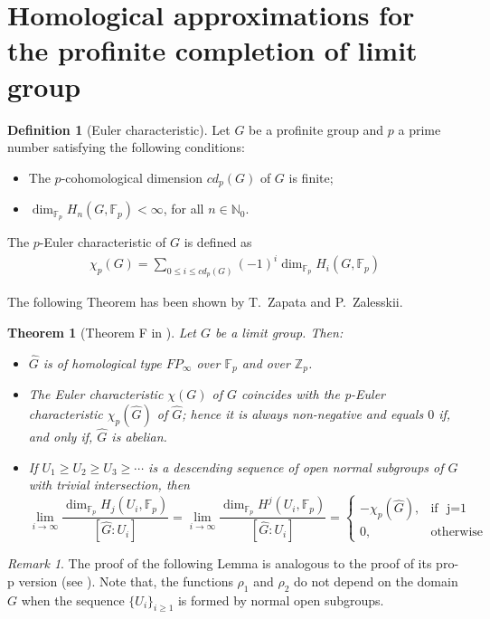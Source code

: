 \documentclass[10pt]{amsart}
\theoremstyle{plain}
\newtheorem{thm}[prop]{Theorem}
\theoremstyle{definition}
\newtheorem*{defi}{Definition}
\theoremstyle{remark}
\newtheorem{rem}[prop]{Remark}
\numberwithin{prop}{section}
\numberwithin{example}{section}
\numberwithin{equation}{section}
\newcommand{\Z}{\mathbb{Z}}
\newcommand{\N}{\mathbb{N}}
\newcommand{\F}{\mathbb{F}}
\begin{document}
	\section{Homological approximations for the   profinite completion  of  limit group}
	\label{nsb}
\begin{defi}[Euler characteristic]
		Let   $G$ be a profinite group  and $p$ a prime number   satisfying the following  conditions:   
		\begin{itemize}
			\item[(i)]  The  $p$-cohomological dimension $cd_p(G)$ of $G$  is finite;
			\item[(ii)] $\dim_{\F_p}H_n(G,\F_p)< \infty$, for all $n\in \N_0$.
		\end{itemize} 
	The $p$-Euler characteristic of    $G$  is defined as
	\begin{align} \label{e01}
 \chi_p(G)=\displaystyle\sum_{0\leq i\leq cd_p(G)}{(-1)^i \dim_{\F_p}{H_i(G,\F_p)}}
	\end{align} 
\end{defi}
The following Theorem  has  been shown by  T.~Zapata and P.~Zalesskii.
\begin{thm}[Theorem F in  \cite{TZ}]\label{TZa}
Let $G$ be  a limit group. Then:
\begin{itemize}
\item[(a)] $\widehat{G}$ is of homological type $FP_{\infty}$ over $\F_p$ and over $\Z_p$. 
	\item[(b)] The  Euler  characteristic $\chi({G})$ of $G$  coincides 	with the  p-Euler characteristic $\chi_p(\widehat{G})$ of $\widehat{G}$; hence 	it is always non-negative  and equals $0$ if, and only if, $\widehat{G}$ is abelian.
	\item[(c)] If $U_1\geq U_2 \geq U_3 \geq \cdots$ is a descending sequence of open normal subgroups 	of $\widehat{G}$ with trivial intersection, then 
	\begin{equation*}\label{e02}	
	\displaystyle\lim_{i\rightarrow\infty} \frac{\dim_{\F_p}H_j(U_i, \F_p)}{[\widehat{G} : U_i]}=\displaystyle\lim_{i\rightarrow\infty} \frac{\dim_{\F_p}H^j(U_i, \F_p)}{[\widehat{G} : U_i]}= \left \{ \begin{matrix} -\chi_p(\widehat{G}), & \mbox{if }\mbox{ j=1}
	\\ 0, & \mbox{otherwise }\end{matrix}\right. 
	\end{equation*}
	
\end{itemize}
\end{thm}
\begin{rem}
The proof of the following Lemma is analogous to the proof of its pro-p version (see  \cite[\S 5,  Thm.~5.1]{AC}). Note that,  the functions $\rho_1$ and $\rho_2$  do not depend on the domain $G$  when the sequence $\{U_i\}_{i\geq 1}$  is formed by normal open subgroups. 
\end{rem}
\end{document}
